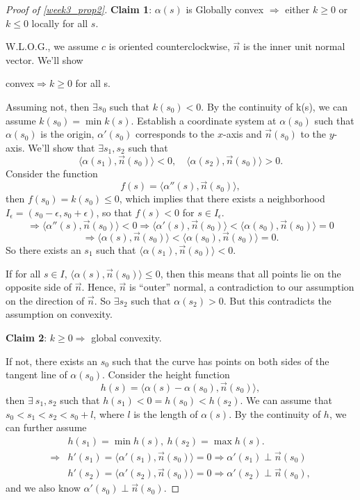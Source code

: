 \begin{proof}[Proof of \cref{week3_prop2}]\hfill

    \textbf{Claim 1}: $\alpha(s)$ is Globally convex $\Rightarrow$ either $k\ge 0$ or $k\le 0$ locally for all $s$.

    W.L.O.G., we assume $c$ is oriented counterclockwise, $\vec{n}$ is the
    inner unit normal vector. We'll show
    \begin{center}
        convex$\Rightarrow k\ge 0$ for all s.
    \end{center}

    Assuming not, then $\exists s_0$ such that $k(s_0)<0$. By the
    continuity of k(s), we can assume $k(s_0)=\min k(s)$. Establish a
    coordinate system at $\alpha(s_0)$ such that $\alpha(s_0)$ is the
    origin, $\alpha'(s_0)$ corresponds to the $x$-axis and $\vec{n}(s_0)$
    to the $y$-axis. We'll show that $\exists s_1,s_2$ such that
    \[\langle \alpha(s_1),\vec{n}(s_0)\rangle<0,\quad
        \langle \alpha(s_2),\vec{n}(s_0)\rangle>0.\]
    Consider the function
    \[f(s)=\langle \alpha''(s),\vec{n}(s_0)\rangle,\]
    then $f(s_0)=k(s_0)\le 0$, which implies that there exists a neighborhood
    $I_\epsilon=(s_0-\epsilon,s_0+\epsilon)$, so that $f(s)<0$ for $s\in I_\epsilon$.
    \[\Rightarrow \langle \alpha''(s),\vec{n}(s_0)\rangle<0
        \Rightarrow \langle \alpha'(s),\vec{n}(s_0)\rangle<
        \langle \alpha(s_0),\vec{n}(s_0)\rangle=0
    \]
    \[\Rightarrow \langle \alpha(s),\vec{n}(s_0)\rangle<
        \langle \alpha(s_0),\vec{n}(s_0)\rangle=0
        .\]
    So there exists an $s_1$ such that $\langle \alpha(s_1),\vec{n}(s_0)\rangle<0.$

    If for all $s\in I$, $\langle \alpha(s),\vec{n}(s_0)\rangle\le 0$, then this means that all points lie on the opposite side of $\vec{n}$. Hence, $\vec{n}$ is ``outer'' normal, a contradiction to our assumption on the direction of $\vec{n}$. So $\exists s_2$ such that $\alpha(s_2)>0$. But this contradicts the assumption on convexity.

    \textbf{Claim 2}: $k\ge 0 \Rightarrow$ global convexity.

    If not, there exists an $s_0$ such that the curve has points on both sides of the tangent line of $\alpha(s_0)$. Consider the height function
    \[h(s)=\langle \alpha(s)-\alpha(s_0),\vec{n}(s_0)\rangle,\]
    then $\exists~s_1, s_2$ such that $h(s_1)<0=h(s_0)<h(s_2)$.
    We can assume that $s_0<s_1<s_2<s_0+l$, where $l$ is the length of $\alpha(s)$. By the continuity of $h$, we can further assume
    \begin{align*}
                    & h(s_1)=\min h(s),~ h(s_2)=\max h(s).            \\
        \Rightarrow & h'(s_1)=\langle\alpha'(s_1),\vec{n}(s_0)\rangle
        =0 \Rightarrow \alpha'(s_1) \perp \vec{n}(s_0)                \\
                    & h'(s_2)=\langle\alpha'(s_2),\vec{n}(s_0)\rangle
        =0 \Rightarrow  \alpha'(s_2) \perp \vec{n}(s_0)
        ,\end{align*}
    and we also know $\alpha'(s_0)\perp \vec{n}(s_0)$.


\end{proof}
